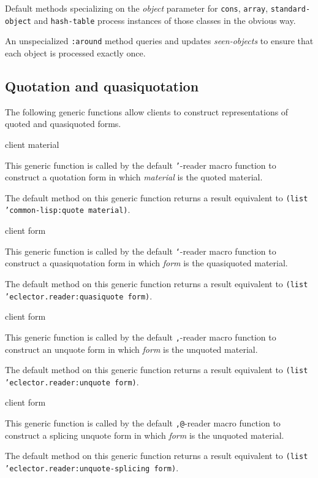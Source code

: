 Default methods specializing on the \textit{object} parameter for
\texttt{cons}, \texttt{array}, \texttt{standard-object} and
\texttt{hash-table} process instances of those classes in the obvious
way.

An unspecialized \texttt{:around} method queries and updates
\textit{seen-objects} to ensure that each object is processed exactly
once.

\subsection{Quotation and quasiquotation}
\label{sec:quotation-and-quasiquotation}

The following generic functions allow clients to construct
representations of quoted and quasiquoted forms.

 {client material}

This generic function is called by the default \texttt{'}-reader macro
function to construct a quotation form in which \textit{material} is
the quoted material.

The default method on this generic function returns a result
equivalent to \texttt{(list 'common-lisp:quote material)}.

 {client form}

This generic function is called by the default \texttt{`}-reader macro
function to construct a quasiquotation form in which \textit{form} is
the quasiquoted material.

The default method on this generic function returns a result
equivalent to \texttt{(list 'eclector.reader:quasiquote form)}.

 {client form}

This generic function is called by the default \texttt{,}-reader macro
function to construct an unquote form in which \textit{form} is the
unquoted material.

The default method on this generic function returns a result
equivalent to \texttt{(list 'eclector.reader:unquote form)}.

 {client form}

This generic function is called by the default \texttt{,@}-reader
macro function to construct a splicing unquote form in which
\textit{form} is the unquoted material.

The default method on this generic function returns a result
equivalent to \texttt{(list 'eclector.reader:unquote-splicing form)}.

